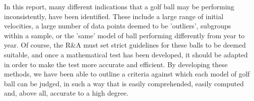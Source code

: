 \documentclass[11pt]{article}
\begin{document}
In this report, many different indications that a golf ball may be performing inconsistently, have been identified. These include a large range of initial velocities, a large number of data points deemed to be 'outliers', subgroups within a sample, or the 'same' model of ball performing differently from year to year. Of course, the R\&A must set strict guidelines for these balls to be deemed suitable, and once a mathematical test has been developed, it should be adapted in order to make the test more accurate and efficient. By developing these methods, we have been able to outline a criteria against which each model of golf ball can be judged, in such a way that is easily comprehended, easily computed and, above all, accurate to a high degree. 

\newpage

\printbibliography
\end{document}
